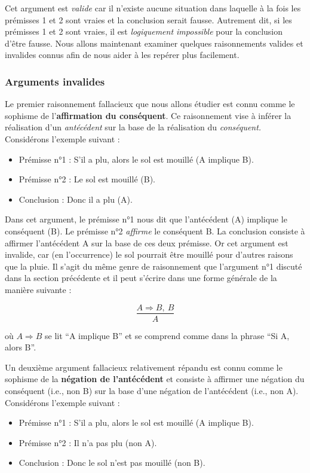 \documentclass[
  a4paper,11pt,twoside,onecolumn,openright,final,oldfontcommands]{memoir}
\providecommand{\tightlist}{%
  \setlength{\itemsep}{0pt}\setlength{\parskip}{0pt}}
\theoremstyle{definition}
\theoremstyle{definition}
\theoremstyle{definition}
\theoremstyle{definition}
\theoremstyle{remark}
\begin{document}
Cet argument est \emph{valide} car il n'existe aucune situation dans laquelle à la fois les prémisses 1 et 2 sont vraies et la conclusion serait fausse. Autrement dit, si les prémisses 1 et 2 sont vraies, il est \emph{logiquement impossible} pour la conclusion d'être fausse. Nous allons maintenant examiner quelques raisonnements valides et invalides connus afin de nous aider à les repérer plus facilement.

\hypertarget{arguments-invalides}{%
\subsubsection{Arguments invalides}\label{arguments-invalides}}

Le premier raisonnement fallacieux que nous allons étudier est connu comme le sophisme de l'\textbf{affirmation du conséquent}. Ce raisonnement vise à inférer la réalisation d'un \emph{antécédent} sur la base de la réalisation du \emph{conséquent.} Considérons l'exemple suivant :

\begin{itemize}
\tightlist
\item
  Prémisse n°1 : S'il a plu, alors le sol est mouillé (A implique B).
\item
  Prémisse n°2 : Le sol est mouillé (B).
\item
  Conclusion : Donc il a plu (A).
\end{itemize}

Dans cet argument, le prémisse n°1 nous dit que l'antécédent (A) implique le conséquent (B). Le prémisse n°2 \emph{affirme} le conséquent B. La conclusion consiste à affirmer l'antécédent A sur la base de ces deux prémisse. Or cet argument est invalide, car (en l'occurrence) le sol pourrait être mouillé pour d'autres raisons que la pluie. Il s'agit du même genre de raisonnement que l'argument n°1 discuté dans la section précédente et il peut s'écrire dans une forme générale de la manière suivante :

\[\dfrac{A \Rightarrow B, \ B}{A}\]

où \(A \Rightarrow B\) se lit ``A implique B'' et se comprend comme dans la phrase ``Si A, alors B''.

Un deuxième argument fallacieux relativement répandu est connu comme le sophisme de la \textbf{négation de l'antécédent} et consiste à affirmer une négation du conséquent (i.e., non B) sur la base d'une négation de l'antécédent (i.e., non A). Considérons l'exemple suivant :

\begin{itemize}
\tightlist
\item
  Prémisse n°1 : S'il a plu, alors le sol est mouillé (A implique B).
\item
  Prémisse n°2 : Il n'a pas plu (non A).
\item
  Conclusion : Donc le sol n'est pas mouillé (non B).
\end{itemize}
\end{document}
